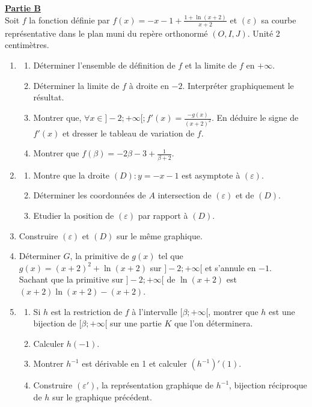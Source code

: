 \documentclass[12pt,a4paper]{article}
\begin{document}
\noindent \underline{\textbf{Partie B}} \\
Soit $f$ la fonction définie par $f(x) = -x - 1 + \frac{1 + \ln(x+2)}{x+2}$ et $(\varepsilon)$ sa courbe représentative dans le plan muni du repère orthonormé $(O, I, J)$. Unité 2 centimètres.
\begin{enumerate}
    \item \begin{enumerate}
        \item Déterminer l'ensemble de définition de $f$ et la limite de $f$ en $+\infty$.
        \item Déterminer la limite de $f$ à droite en $-2$. Interpréter graphiquement le résultat.
        \item Montrer que, $\forall x \in ]-2; +\infty[ ; f'(x) = \frac{-g(x)}{(x+2)^2}$. En déduire le signe de $f'(x)$ et dresser le tableau de variation de $f$.
        \item Montrer que $f(\beta) = -2\beta - 3 + \frac{1}{\beta+2}$.
    \end{enumerate}
    \item \begin{enumerate}
        \item Montre que la droite $(D) : y = -x - 1$ est asymptote à $(\varepsilon)$.
        \item Déterminer les coordonnées de $A$ intersection de $(\varepsilon)$ et de $(D)$.
        \item Etudier la position de $(\varepsilon)$ par rapport à $(D)$.
    \end{enumerate}
    \item Construire $(\varepsilon)$ et $(D)$ sur le même graphique.
    \item Déterminer $G$, la primitive de $g(x)$ tel que $g(x) = (x+2)^2 + \ln(x+2)$ sur $]-2; +\infty[$ et s'annule en $-1$. \\
    Sachant que la primitive sur $]-2; +\infty[$ de $\ln(x+2)$ est $(x+2)\ln(x+2) - (x+2)$.
    \item \begin{enumerate}
        \item Si $h$ est la restriction de $f$ à l'intervalle $[\beta; +\infty[$, montrer que $h$ est une bijection de $[\beta; +\infty[$ sur une partie $K$ que l'on déterminera.
        \item Calculer $h(-1)$.
        \item Montrer $h^{-1}$ est dérivable en 1 et calculer $(h^{-1})'(1)$.
        \item Construire $(\varepsilon')$, la représentation graphique de $h^{-1}$, bijection réciproque de $h$ sur le graphique précédent.
    \end{enumerate}
\end{enumerate}
\end{document}
